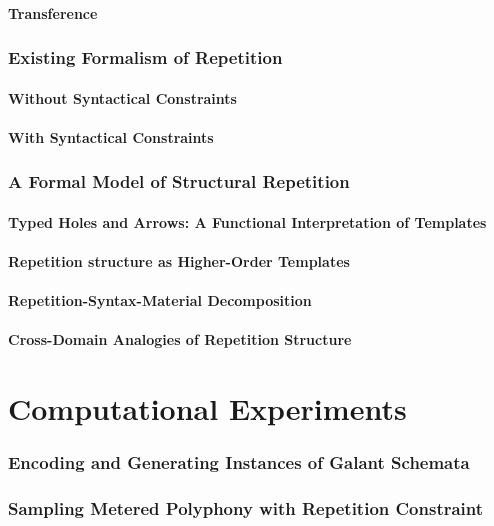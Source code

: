         \subsection{Transference}

    \section{Existing Formalism of Repetition}
        \subsection{Without Syntactical Constraints}
        \subsection{With Syntactical Constraints}

    \section{A Formal Model of Structural Repetition}
        \subsection{Typed Holes and Arrows: A Functional Interpretation of Templates}
        \subsection{Repetition structure as Higher-Order Templates}
        \subsection{Repetition-Syntax-Material Decomposition}
        \subsection{Cross-Domain Analogies of Repetition Structure}

%
%
\cleardoublepage
\part{Computational Experiments}
    \section{Encoding and Generating Instances of Galant Schemata}
    \section{Sampling Metered Polyphony with Repetition Constraint}
